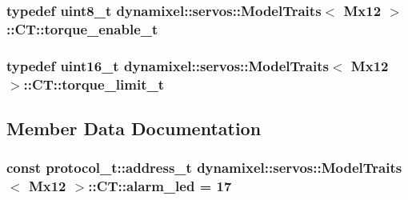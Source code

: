 \subsubsection[{\texorpdfstring{torque\+\_\+enable\+\_\+t}{torque_enable_t}}]{\setlength{\rightskip}{0pt plus 5cm}typedef uint8\+\_\+t {\bf dynamixel\+::servos\+::\+Model\+Traits}$<$ {\bf Mx12} $>$\+::{\bf C\+T\+::torque\+\_\+enable\+\_\+t}}\hypertarget{structdynamixel_1_1servos_1_1_model_traits_3_01_mx12_01_4_1_1_c_t_af4a625aa0e66c8d8e6db7af0c6904315}{}\label{structdynamixel_1_1servos_1_1_model_traits_3_01_mx12_01_4_1_1_c_t_af4a625aa0e66c8d8e6db7af0c6904315}
\subsubsection[{\texorpdfstring{torque\+\_\+limit\+\_\+t}{torque_limit_t}}]{\setlength{\rightskip}{0pt plus 5cm}typedef uint16\+\_\+t {\bf dynamixel\+::servos\+::\+Model\+Traits}$<$ {\bf Mx12} $>$\+::{\bf C\+T\+::torque\+\_\+limit\+\_\+t}}\hypertarget{structdynamixel_1_1servos_1_1_model_traits_3_01_mx12_01_4_1_1_c_t_aa409267d672656e8a8931c9d4ca616b6}{}\label{structdynamixel_1_1servos_1_1_model_traits_3_01_mx12_01_4_1_1_c_t_aa409267d672656e8a8931c9d4ca616b6}


\subsection{Member Data Documentation}
\subsubsection[{\texorpdfstring{alarm\+\_\+led}{alarm_led}}]{\setlength{\rightskip}{0pt plus 5cm}const {\bf protocol\+\_\+t\+::address\+\_\+t} {\bf dynamixel\+::servos\+::\+Model\+Traits}$<$ {\bf Mx12} $>$\+::C\+T\+::alarm\+\_\+led = 17\hspace{0.3cm}{\ttfamily [static]}}\hypertarget{structdynamixel_1_1servos_1_1_model_traits_3_01_mx12_01_4_1_1_c_t_aaa4a7b7c97bc8aac3453eecbd5471908}{}\label{structdynamixel_1_1servos_1_1_model_traits_3_01_mx12_01_4_1_1_c_t_aaa4a7b7c97bc8aac3453eecbd5471908}
